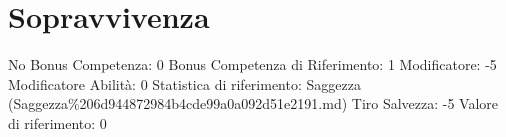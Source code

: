 \section{Sopravvivenza}\label{sopravvivenza}

\begin{description}
\tightlist
\item[Tags: ABI]
No Bonus Competenza: 0 Bonus Competenza di Riferimento: 1 Modificatore:
-5 Modificatore Abilità: 0 Statistica di riferimento: Saggezza
(Saggezza\%206d944872984b4cde99a0a092d51e2191.md) Tiro Salvezza: -5
Valore di riferimento: 0
\end{description}
